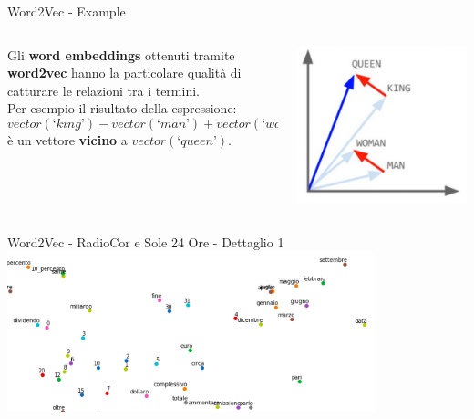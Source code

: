 \documentclass[british]{beamer}
\begin{document}
\begin{frame}{Word2Vec - Example}
	\begin{columns}
		\begin{column}{0.6\textwidth}
			Gli \textbf{word embeddings} ottenuti tramite \textbf{word2vec} hanno la particolare qualit\`{a} di catturare le relazioni tra i termini.\\
			Per esempio il risultato della espressione:
			\begin{equation*}
				vector(‘king’) - vector(‘man’) + vector(‘woman’)
			\end{equation*}
			\`{e} un vettore \textbf{vicino} a \(vector(‘queen’)\).
		\end{column}
		\begin{column}{0.4\textwidth}
			\includegraphics[width = \textwidth]{./Imgs/w2v-example.png}
		\end{column}
	\end{columns}
\end{frame}

\begin{frame}{Word2Vec - RadioCor e Sole 24 Ore - Dettaglio 1}
	\includegraphics[width = 0.8\textwidth]{./Imgs/plot-numeri.png}
\end{frame}
\end{document}
